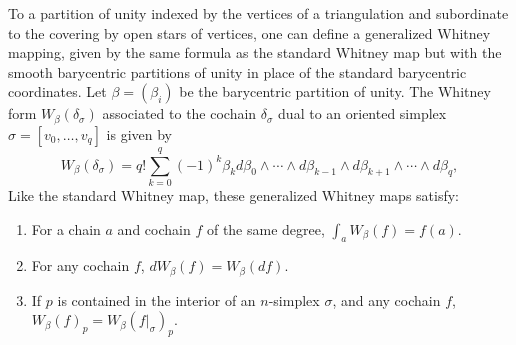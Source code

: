 To a partition of unity indexed by the vertices of a triangulation and subordinate to the covering by open stars of vertices, one can define a generalized Whitney mapping, given by the same formula as the standard Whitney map but with the smooth barycentric partitions of unity in place of the standard barycentric coordinates. Let $\beta = (\beta_i)$ be the barycentric partition of unity. The Whitney form $W_{\beta}(\delta_{\sigma})$ associated to the cochain $\delta_{\sigma}$ dual to an  oriented simplex $\sigma = [v_0,\dots,v_q]$ is given by $$W_{\beta}(\delta_{\sigma}) = q! \sum_{k=0}^q(-1)^k\beta_{k}d\beta_0\wedge \cdots \wedge d \beta_{k-1}\wedge d \beta_{k+1}\wedge \cdots \wedge d \beta_q,$$ Like the standard Whitney map, these generalized Whitney maps satisfy:
\begin{enumerate}
	\item For a chain $a$ and cochain $f$ of the same degree, $\int_aW_{\beta}(f) = f(a).$
	\item For any cochain $f$, $dW_{\beta}(f) = W_{\beta}(df)$.
	\item If $p$ is contained in the interior of an  $n$-simplex $\sigma$, and any cochain $f$, $W_{\beta}(f)_p = W_{\beta}(f|_{\sigma})_p$.
\end{enumerate}

